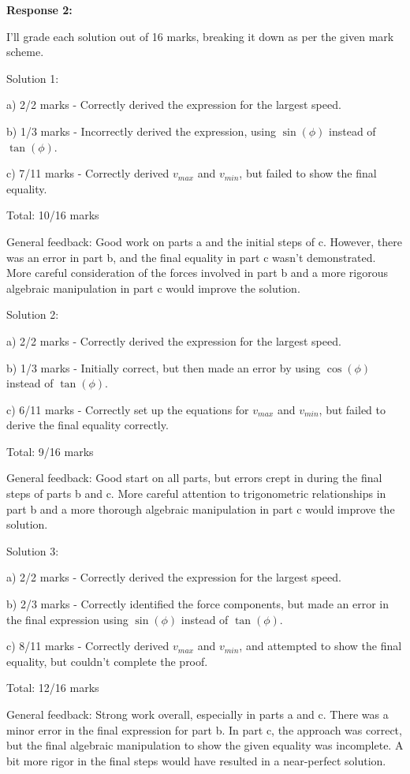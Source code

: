 \documentclass[a4paper,11pt]{article}
\begin{document}
\bigskip
\textbf{Response 2:}

I'll grade each solution out of 16 marks, breaking it down as per the given mark scheme.

Solution 1:

a) 2/2 marks - Correctly derived the expression for the largest speed.

b) 1/3 marks - Incorrectly derived the expression, using \(\sin(\phi)\) instead of \(\tan(\phi)\).

c) 7/11 marks - Correctly derived \(v_{max}\) and \(v_{min}\), but failed to show the final equality.

Total: 10/16 marks

General feedback: Good work on parts a and the initial steps of c. However, there was an error in part b, and the final equality in part c wasn't demonstrated. More careful consideration of the forces involved in part b and a more rigorous algebraic manipulation in part c would improve the solution.

Solution 2:

a) 2/2 marks - Correctly derived the expression for the largest speed.

b) 1/3 marks - Initially correct, but then made an error by using \(\cos(\phi)\) instead of \(\tan(\phi)\).

c) 6/11 marks - Correctly set up the equations for \(v_{max}\) and \(v_{min}\), but failed to derive the final equality correctly.

Total: 9/16 marks

General feedback: Good start on all parts, but errors crept in during the final steps of parts b and c. More careful attention to trigonometric relationships in part b and a more thorough algebraic manipulation in part c would improve the solution.

Solution 3:

a) 2/2 marks - Correctly derived the expression for the largest speed.

b) 2/3 marks - Correctly identified the force components, but made an error in the final expression using \(\sin(\phi)\) instead of \(\tan(\phi)\).

c) 8/11 marks - Correctly derived \(v_{max}\) and \(v_{min}\), and attempted to show the final equality, but couldn't complete the proof.

Total: 12/16 marks

General feedback: Strong work overall, especially in parts a and c. There was a minor error in the final expression for part b. In part c, the approach was correct, but the final algebraic manipulation to show the given equality was incomplete. A bit more rigor in the final steps would have resulted in a near-perfect solution.
\end{document}
